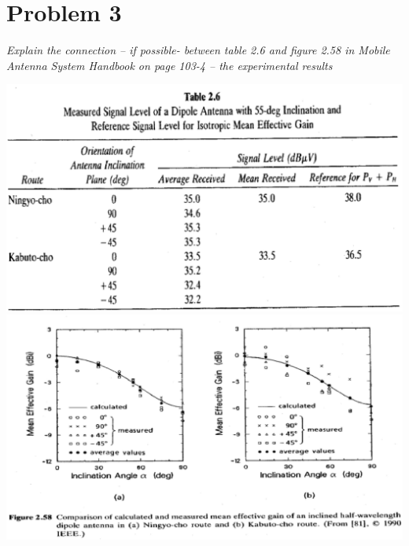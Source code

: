 \section{Problem 3}
\textit{Explain the connection – if possible- between table 2.6 and figure 2.58 in Mobile Antenna System Handbook on page 103-4 – the experimental results}\\

\begin{center}
\includegraphics[scale=0.6]{figures/Tabel_2_6.eps}\\
\includegraphics[scale=0.85]{figures/Figure_2_58.eps}
\end{center}


